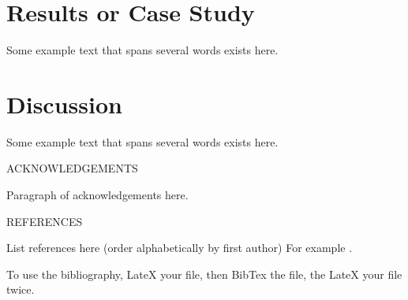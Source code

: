 \documentclass[10pt,fleqn]{article} %
\begin{document}
\section*{Results or Case Study}

 Some example text that spans several words exists here.  

\section*{Discussion}

 Some example text that spans several words exists here. 
 
\begin{center}\textsc{ACKNOWLEDGEMENTS}\end{center} 
Paragraph of acknowledgements here.

\begin{center}\textsc{REFERENCES}\end{center}
List references here (order alphabetically by first author) For example \cite{Cowen:2006}. 

To use the bibliography, LateX your file, then BibTex the file, the LateX your file twice.
\bigskip




\end{document}
